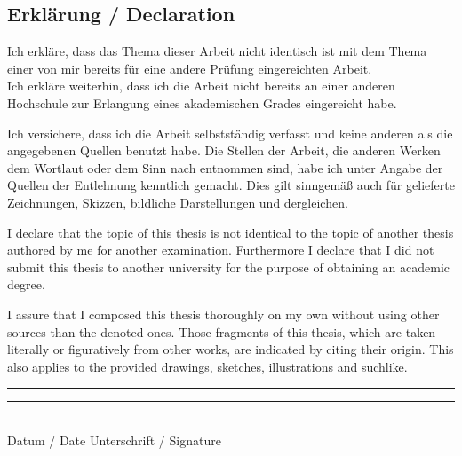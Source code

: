 \documentclass[11pt, a4paper]{article}
\begin{document}
\newpage

\listoffigures

\newpage

{}


\newpage

\thispagestyle{empty}

\begin{center}
\subsection*{Erklärung / Declaration}
\end{center}
\vspace{0.5cm}
Ich erkläre, dass das Thema dieser Arbeit nicht identisch ist mit dem Thema einer von mir bereits für eine andere Prüfung eingereichten Arbeit.\\
Ich erkläre weiterhin, dass ich die Arbeit nicht bereits an einer anderen Hochschule zur Erlangung eines akademischen Grades eingereicht habe.

\vspace{0.8cm}
Ich versichere, dass ich die Arbeit selbstständig verfasst und keine anderen als die angegebenen Quellen benutzt habe. Die Stellen der Arbeit, die anderen Werken dem Wortlaut oder dem Sinn nach entnommen sind, habe ich unter Angabe der Quellen der Entlehnung kenntlich gemacht. Dies gilt sinngemäß auch für gelieferte Zeichnungen, Skizzen, bildliche Darstellungen und dergleichen.

\vspace{2cm}
I declare that the topic of this thesis is not identical to the topic of another thesis authored by me for another examination. Furthermore I declare that I did not submit this thesis to another university for the purpose of obtaining an academic degree.

\vspace{0.8cm}
I assure that I composed this thesis thoroughly on my own without using other sources than the denoted ones. Those fragments of this thesis, which are taken literally or figuratively from other works, are indicated by citing their origin. This also applies to the provided drawings, sketches, illustrations and suchlike.

\vspace{1.5cm}
\rule[0.05cm]{5cm}{0.5pt} \hspace{4.5cm} \rule[0.05cm]{5cm}{0.5pt}\\
Datum / Date \hspace{7.1cm} Unterschrift / Signature
\end{document}
